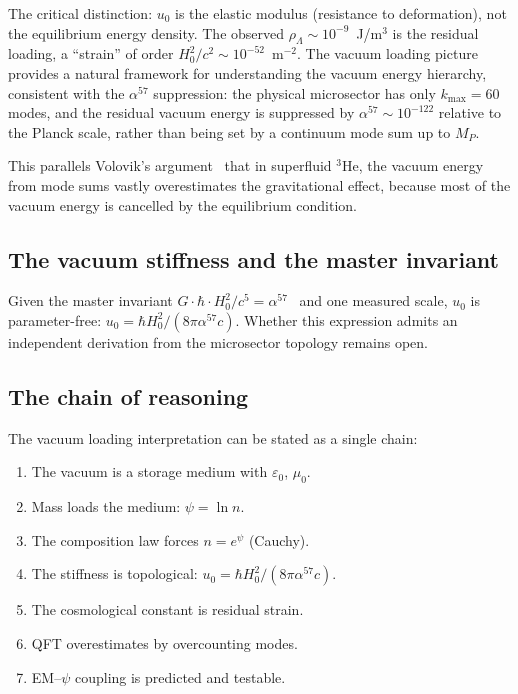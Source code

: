 \documentclass[aps,prd,twocolumn,superscriptaddress,nofootinbib]{revtex4-2}
\begin{document}
The critical distinction: $u_0$ is the elastic modulus (resistance to
deformation), not the equilibrium energy density.  The observed
$\rho_\Lambda \sim 10^{-9}$~J/m$^3$ is the residual loading, a
``strain'' of order $H_0^2/c^2 \sim 10^{-52}$~m$^{-2}$.  The vacuum
loading picture provides a natural framework for understanding the
vacuum energy hierarchy, consistent with the $\alpha^{57}$ suppression:
the physical microsector has only $k_{\max} = 60$ modes, and the
residual vacuum energy is suppressed by $\alpha^{57} \sim 10^{-122}$
relative to the Planck scale, rather than being set by a continuum
mode sum up to $M_P$.

This parallels Volovik's argument~\cite{Volovik2003} that in
superfluid $^3$He, the vacuum energy from mode sums vastly
overestimates the gravitational effect, because most of the vacuum
energy is cancelled by the equilibrium condition.

\subsection{The vacuum stiffness and the master invariant}

Given the master invariant $G\cdot\hbar\cdot H_0^2/c^5 =
\alpha^{57}$~\cite{Alcock2025AbInitio} and one measured scale, $u_0$
is parameter-free:
$u_0 = \hbar H_0^2/(8\pi\alpha^{57}c)$.  Whether this expression
admits an independent derivation from the microsector topology remains
open.

\subsection{The chain of reasoning}

The vacuum loading interpretation can be stated as a single chain:
\begin{enumerate}
\item The vacuum is a storage medium with $\varepsilon_0$, $\mu_0$.
\item Mass loads the medium: $\psi = \ln n$.
\item The composition law forces $n = e^\psi$ (Cauchy).
\item The stiffness is topological:
$u_0 = \hbar H_0^2/(8\pi\alpha^{57}c)$.
\item The cosmological constant is residual strain.
\item QFT overestimates by overcounting modes.
\item EM--$\psi$ coupling is predicted and testable.
\end{enumerate}
\end{document}
